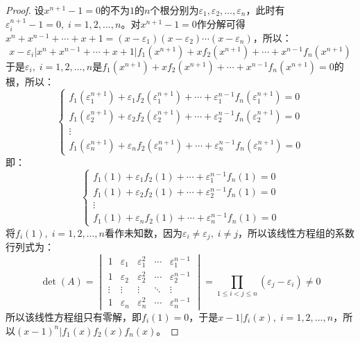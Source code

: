 \begin{proof}
	设$x^{n+1}-1=0$的不为$1$的$n$个根分别为$\varepsilon_1,\varepsilon_2,\dots,\varepsilon_n$，此时有$\varepsilon_i^{n+1}-1=0,\;i=1,2,\dots,n$。对$x^{n+1}-1=0$作分解可得$x^n+x^{n-1}+\cdots+x+1=(x-\varepsilon_1)(x-\varepsilon_2)\cdots(x-\varepsilon_n)$，所以：
	\begin{equation*}
		x-\varepsilon_i\Big|x^n+x^{n-1}+\cdots+x+1\Big|f_1(x^{n+1})+xf_2(x^{n+1})+\cdots+x^{n-1}f_n(x^{n+1})
	\end{equation*}
	于是$\varepsilon_i,\;i=1,2,\dots,n$是$f_1(x^{n+1})+xf_2(x^{n+1})+\cdots+x^{n-1}f_n(x^{n+1})=0$的根，所以：
	\[
	\begin{cases}
		f_1(\varepsilon_1^{n+1}) + \varepsilon_1 f_2(\varepsilon_1^{n+1}) + \cdots + \varepsilon_1^{n-1} f_n(\varepsilon_1^{n+1}) = 0 \\
		f_1(\varepsilon_2^{n+1}) + \varepsilon_2 f_2(\varepsilon_2^{n+1}) + \cdots + \varepsilon_2^{n-1} f_n(\varepsilon_2^{n+1}) = 0 \\
		\vdots \\
		f_1(\varepsilon_n^{n+1}) + \varepsilon_n f_2(\varepsilon_n^{n+1}) + \cdots + \varepsilon_n^{n-1} f_n(\varepsilon_n^{n+1}) = 0
	\end{cases}
	\]
	即：
	\[
	\begin{cases}
		f_1(1) + \varepsilon_1 f_2(1) + \cdots + \varepsilon_1^{n-1} f_n(1) = 0 \\
		f_1(1) + \varepsilon_2 f_2(1) + \cdots + \varepsilon_2^{n-1} f_n(1) = 0 \\
		\vdots \\
		f_1(1) + \varepsilon_n f_2(1) + \cdots + \varepsilon_n^{n-1} f_n(1) = 0
	\end{cases}
	\]
	将$f_i(1),\;i=1,2,\dots,n$看作未知数，因为$\varepsilon_i\ne\varepsilon_j,\;i\ne j$，所以该线性方程组的系数行列式为：
	\[
	\det(A) =
	\begin{vmatrix}
		1 & \varepsilon_1 & \varepsilon_1^2 & \cdots & \varepsilon_1^{n-1} \\
		1 & \varepsilon_2 & \varepsilon_2^2 & \cdots & \varepsilon_2^{n-1} \\
		\vdots & \vdots & \vdots & \ddots & \vdots \\
		1 & \varepsilon_n & \varepsilon_n^2 & \cdots & \varepsilon_n^{n-1}
	\end{vmatrix}
	= \prod_{1 \leq i < j \leq n} (\varepsilon_j - \varepsilon_i)
	\ne 0
	\]
	所以该线性方程组只有零解，即$f_i(1)=0$，于是$x-1|f_i(x),\;i=1,2,\dots,n$，所以$(x-1)^n|f_1(x)f_2(x)f_n(x)$。
\end{proof}
